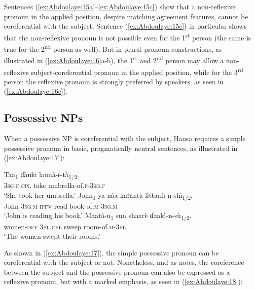 \documentclass[output=paper]{langscibook}
\begin{document}
    
Sentences (\ref{ex:Abdoulaye:15a}--\ref{ex:Abdoulaye:15c}) show that a non-reflexive pronoun in the applied position, despite matching agreement features, cannot be coreferential with the subject. Sentence (\ref{ex:Abdoulaye:15c}) in particular shows that the non-reflexive pronoun is not possible even for the 1\textsuperscript{st} person (the same is true for the 2\textsuperscript{nd} person as well). But in plural pronoun constructions, as illustrated in (\ref{ex:Abdoulaye:16}a-b), the 1\textsuperscript{st} and 2\textsuperscript{nd} person may allow a non-reflexive subject-coreferential pronoun in the applied position, while for the 3\textsuperscript{rd} person the reflexive pronoun is strongly preferred by speakers, as seen in (\ref{ex:Abdoulaye:16c}).


\subsection{Possessive NPs} \label{sec:Abdoulaye:4.2}

When a possessive NP is coreferential with the subject, Hausa requires a simple possessive pronoun in basic, pragmatically neutral sentences, as illustrated in (\ref{ex:Abdoulaye:17}):

\ea%
    \label{ex:Abdoulaye:17}
    \ea \label{ex:Abdoulaye:17a}
    \gll Taa\textsubscript{1} ɗàuki  laimà-ɍ{}-tà\textsubscript{1/2}.\\
    \textsc{3sg.f.cpl}  take  umbrella-of.\textsc{f-3sg.f}\\
    \glt `She took her umbrella.’
    \ex \label{ex:Abdoulaye:17b}
    \gll John\textsubscript{1} ya-nàa  kaɍàntà  littaafì-n-shì\textsubscript{1/2}.\\
    John  \textsc{3sg.m-ipfv}  read  book-of.\textsc{m-3sg.m}\\
    \glt `John is reading his book.’
    \ex \label{ex:Abdoulaye:17c}
    \gll  Maatâ-n\textsubscript{1} sun  shaarè  ɗaakì-n-sù\textsubscript{1/2}.\\
    women-\textsc{def}  \textsc{3pl.cpl}  sweep  room-of.\textsc{m-3pl}\\
    \glt `The women swept their rooms.’
    \z
\z
  
        
As shown in (\ref{ex:Abdoulaye:17}), the simple possessive pronoun can be coreferential with the subject or not. Nonetheless, and as \citet[525]{Newman2000} notes, the coreference between the subject and the possessive pronoun can also be expressed as a reflexive pronoun, but with a marked emphasis, as seen in (\ref{ex:Abdoulaye:18}):
\end{document}
